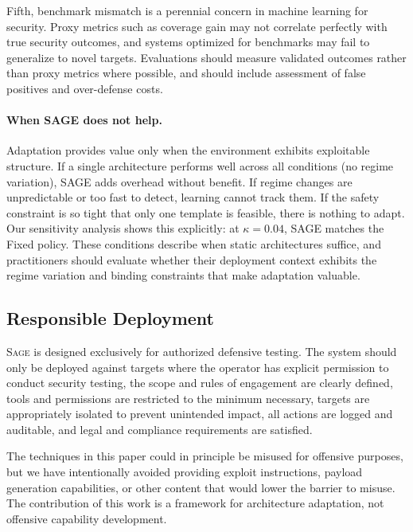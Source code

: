 \documentclass[sigconf,anonymous]{acmart}
\newcommand{\SAGE}{\textsc{Sage}\xspace}
\begin{document}
Fifth, benchmark mismatch is a perennial concern in machine learning for security. Proxy metrics such as coverage gain may not correlate perfectly with true security outcomes, and systems optimized for benchmarks may fail to generalize to novel targets. Evaluations should measure validated outcomes rather than proxy metrics where possible, and should include assessment of false positives and over-defense costs.

\paragraph{When SAGE does not help.} Adaptation provides value only when the environment exhibits exploitable structure. If a single architecture performs well across all conditions (no regime variation), SAGE adds overhead without benefit. If regime changes are unpredictable or too fast to detect, learning cannot track them. If the safety constraint is so tight that only one template is feasible, there is nothing to adapt. Our sensitivity analysis shows this explicitly: at $\kappa=0.04$, SAGE matches the Fixed policy. These conditions describe when static architectures suffice, and practitioners should evaluate whether their deployment context exhibits the regime variation and binding constraints that make adaptation valuable.

\subsection{Responsible Deployment}

\SAGE is designed exclusively for authorized defensive testing. The system should only be deployed against targets where the operator has explicit permission to conduct security testing, the scope and rules of engagement are clearly defined, tools and permissions are restricted to the minimum necessary, targets are appropriately isolated to prevent unintended impact, all actions are logged and auditable, and legal and compliance requirements are satisfied.

The techniques in this paper could in principle be misused for offensive purposes, but we have intentionally avoided providing exploit instructions, payload generation capabilities, or other content that would lower the barrier to misuse. The contribution of this work is a framework for architecture adaptation, not offensive capability development.

\end{document}
